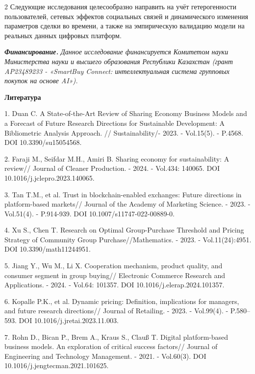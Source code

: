 \begin{multicols}{2}
Следующие исследования целесообразно направить на учёт гетерогенности
пользователей, сетевых эффектов социальных связей и динамического
изменения параметров сделки во времени, а также на эмпирическую
валидацию модели на реальных данных цифровых платформ.

\emph{{\bfseries Финансирование.}} \emph{Данное исследование финансируется
Комитетом науки Министерства науки и высшего образования Республики
Казахстан (грант AP23489233 - «SmartBuy Connect: интеллектуальная
система групповых покупок на основе AI»).}
\end{multicols}

\begin{center}
{\bfseries Литература}
\end{center}

\begin{refs}
1. Duan C. A State-of-the-Art Review of Sharing Economy Business Models
and a Forecast of Future Research Directions for Sustainable
Development: A Bibliometric Analysis Approach. // Sustainability/- 2023.
- Vol.15(5). - P.4568. DOI 10.3390/su15054568.

2. Faraji M., Seifdar M.H., Amiri B. Sharing economy for sustainability:
A review// Journal of Cleaner Production. - 2024. - Vol.434: 140065.
DOI 10.1016/j.jclepro.2023.140065.

3. Tan T.M., et al. Trust in blockchain-enabled exchanges: Future
directions in platform-based markets// Journal of the Academy of
Marketing Science. - 2023. - Vol.51(4). - P.914-939. DOI
10.1007/s11747-022-00889-0.

4. Xu S., Chen T. Research on Optimal Group-Purchase Threshold and
Pricing Strategy of Community Group Purchase//Mathematics. - 2023. -
Vol.11(24):4951. DOI 10.3390/math11244951.

5. Jiang Y., Wu M., Li X. Cooperation mechanism, product quality, and
consumer segment in group buying// Electronic Commerce Research and
Applications. - 2024. - Vol.64: 101357. DOI
10.1016/j.elerap.2024.101357.

6. Kopalle P.K., et al. Dynamic pricing: Definition, implications for
managers, and future research directions// Journal of Retailing. - 2023.
- Vol.99(4). - P.580--593. DOI 10.1016/j.jretai.2023.11.003.

7. Rohn D., Bican P., Brem A., Kraus S., Clauß T. Digital platform-based
business models. An exploration of critical success factors// Journal of
Engineering and Technology Management. - 2021. - Vol.60(3). DOI
10.1016/j.jengtecman.2021.101625.


\end{refs}
